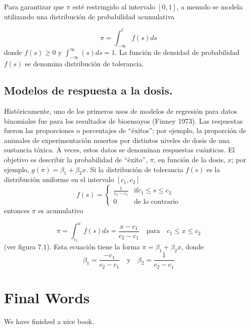 \documentclass[
]{book}
\begin{document}
Para garantizar que \(\pi\) esté restringido al intervalo \([0,1]\), a menudo se modela utilizando una distribución de probabilidad acumulativa

\[
\pi=\int_{-\infty}^{t}f(s)ds
\]
donde \(f(s)\geqslant 0\) y \(\int_{-\infty}^{\infty}(s)ds=1\). La función de densidad de probabilidad \(f(s)\) se denomina distribución de tolerancia.

\hypertarget{modelos-de-respuesta-a-la-dosis.}{%
\section{Modelos de respuesta a la dosis.}\label{modelos-de-respuesta-a-la-dosis.}}

Históricamente, uno de los primeros usos de modelos de regresión para datos binomiales fue para los resultados de bioensayos (Finney 1973). Las respuestas fueron las proporciones o porcentajes de ``éxitos''; por ejemplo, la proporción de animales de experimentación muertos por distintos niveles de dosis de una sustancia tóxica. A veces, estos datos se denominan respuestas cuánticas. El objetivo es describir la probabilidad de ``éxito'', \(\pi\), en función de la dosis, \(x\); por ejemplo, \(g(\pi) = \beta_{1} + \beta_{2}x\). Si la distribución de tolerancia \(f(s)\) es la distribución uniforme en el intervalo \(\left[c_{1}, c_{2}\right]\)
\[
f (s) = \left\{\begin{array}{cc}
\frac{1}{c_{2} -c_{1}} & \text{if} c_{1} \leqslant s \leqslant c_{2} \\
0 & \text{de lo contrario}
\end{array} \right.
\]
entonces \(\pi\) es acumulativo

\[
\pi = \int_{c_{1}}^{x} f (s) ds = \frac{x-c_ {1}} {c_{2} -c_{1}} \quad \text {para}\quad  c_{1} \leqslant x \leqslant c_{2}
\]
(ver figura \(7.1\)). Esta ecuación tiene la forma \(\pi=\beta_{1} + \beta_{2}x\), donde
\[
\beta_{1} = \frac{-c_{1}} {c_{2} -c_{1}} \quad \text{y} \quad \beta_{2} = \frac{1}{c_{2} -c_{ 1}}
\]

\hypertarget{final-words}{%
\chapter{Final Words}\label{final-words}}

We have finished a nice book.

  
\end{document}
